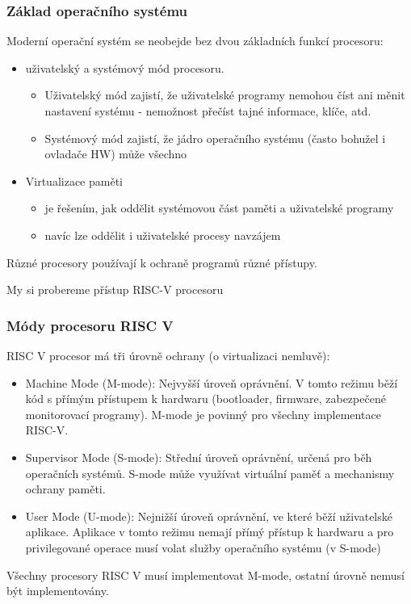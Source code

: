 \documentclass[aspectratio=169]{beamer}
\begin{document}
\begin{frame}
\frametitle{Základ operačního systému}

Moderní operační systém se neobejde bez dvou základních funkcí procesoru:
\begin{itemize}
\item uživatelský a systémový mód procesoru.
\begin{itemize}
\item Uživatelský mód zajistí, že uživatelské programy nemohou číst ani měnit nastavení systému - nemožnost přečíst tajné informace, klíče, atd.
\item Systémový mód zajistí, že jádro operačního systému (často bohužel i ovladače HW) může všechno
\end{itemize}
\item Virtualizace paměti
\begin{itemize}
\item je řešením, jak oddělit systémovou část paměti a uživatelské programy
\item navíc lze oddělit i uživatelské procesy navzájem
\end{itemize}
\end{itemize}
Různé procesory používají k ochraně programů různé přístupy.

My si probereme přístup RISC-V procesoru
\end{frame}



\begin{frame}
\frametitle{Módy procesoru RISC V}

RISC V procesor má tři úrovně ochrany (o virtualizaci nemluvě):
\begin{itemize}
\item Machine Mode (M-mode): Nejvyšší úroveň oprávnění. V tomto režimu běží kód s přímým přístupem k hardwaru (bootloader, firmware, zabezpečené monitorovací programy). M-mode je povinný pro všechny implementace RISC-V.
\item  Supervisor Mode (S-mode): Střední úroveň oprávnění, určená pro běh operačních systémů. S-mode může využívat virtuální paměť a mechanismy ochrany paměti.
\item User Mode (U-mode): Nejnižší úroveň oprávnění, ve které běží uživatelské aplikace. Aplikace v tomto režimu nemají přímý přístup k hardwaru a pro privilegované operace musí volat služby operačního systému (v S-mode)
\end{itemize}

Všechny procesory RISC V musí implementovat M-mode, ostatní úrovně nemusí být implementovány.
\end{frame}
\end{document}

